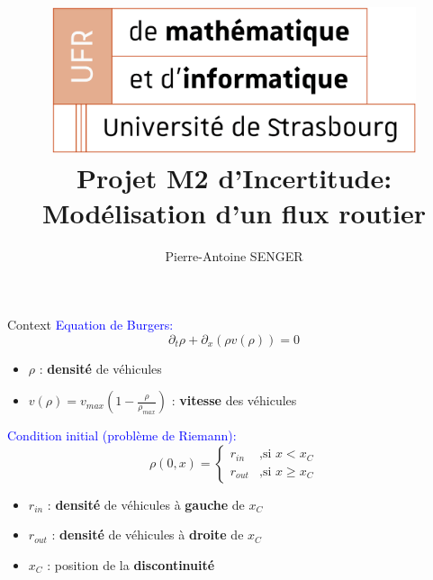 \documentclass[10pt]{beamer}
\title[Projet M2 Incertitude]{
  \includegraphics[width=0.8\textwidth]{images/logo-ufr.png}\\
  Projet M2 d'Incertitude:\\
Modélisation d'un flux routier}
\author[PA Senger]{Pierre-Antoine SENGER}
\date{}
\begin{document}

\begin{frame}{}
  \titlepage
\end{frame}

\begin{frame}{Context}
  \textcolor{blue}{Equation de Burgers:}
  $$ \partial_t \rho + \partial_x (\rho v(\rho)) = 0 $$
  \begin{itemize}
    \item $\rho$ : \textbf{densité} de véhicules
    \item $v(\rho) = v_{max} (1 - \frac{\rho}{\rho_{max}})$ : \textbf{vitesse} des véhicules
  \end{itemize}

  \textcolor{blue}{Condition initial (problème de Riemann):}
  $$ \rho(0, x) =
  \begin{cases} r_{in} & \text{,si } x < x_C \\
    r_{out} & \text{,si } x \geq x_C
  \end{cases} $$
  \begin{itemize}
    \item $r_{in}$ : \textbf{densité} de véhicules à \textbf{gauche} de $x_C$
    \item $r_{out}$ : \textbf{densité} de véhicules à \textbf{droite} de $x_C$
    \item $x_C$ : position de la \textbf{discontinuité}
  \end{itemize}

\end{frame}
\end{document}
